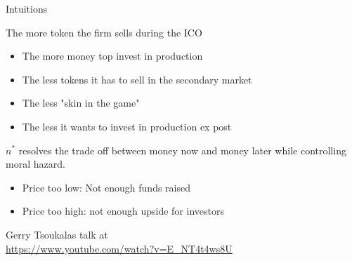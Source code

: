 \documentclass{beamer}
\begin{document}
\begin{frame}{Intuitions}
\scriptsize
\begin{tcolorbox}[enhanced,drop shadow, title=Optimal number of tokens sold $n^\ast$ ]

The more token the firm sells during the ICO
\begin{itemize}
  \item The more money top invest in production
  \item The less tokens it has to sell in the secondary market
  \item The less "skin in the game"
  \item The less it wants to invest in production ex post
\end{itemize}
$n^\ast$ resolves the trade off between money now and money later while controlling moral hazard.
\end{tcolorbox}
\begin{tcolorbox}[enhanced,drop shadow, title=Optimal number of tokens sold $\tau^\ast$ ]


\begin{itemize}
  \item Price too low: Not enough funds raised
  \item Price too high: not enough upside for investors
\end{itemize} 
\end{tcolorbox}
Gerry Tsoukalas talk at \\
\url{https://www.youtube.com/watch?v=E_NT4t4ws8U}
\end{frame}



\end{document}
